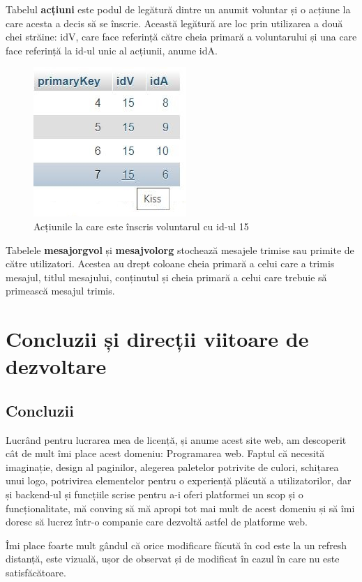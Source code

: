 \documentclass[12pt,a4paper]{report}
\begin{document}
\par
Tabelul \textbf{acțiuni} este podul de legătură dintre un anumit voluntar și o acțiune la care acesta a decis să se înscrie. Această legătură are loc prin utilizarea a două chei străine: idV, care face referință către cheia primară a voluntarului și una care face referință la id-ul unic al acțiunii, anume idA.
\\
\begin{figure}[H]
\centering
  \includegraphics[width=0.4\linewidth]{./imagini/actiuni.jpg}
  \caption{Acțiunile la care este înscris voluntarul cu id-ul 15}
\end{figure}

\par
Tabelele \textbf{mesajorgvol} și \textbf{mesajvolorg} stochează mesajele trimise sau primite de către utilizatori. Acestea au drept coloane cheia primară a celui care a trimis mesajul, titlul mesajului, conținutul și cheia primară a celui care trebuie să primească mesajul trimis.


\chapter{Concluzii și direcții viitoare de dezvoltare}
\section{Concluzii}
\par
Lucrând pentru lucrarea mea de licență, și anume acest site web, am descoperit cât de mult îmi place acest domeniu: Programarea web. Faptul că necesită imaginație, design al paginilor, alegerea paletelor potrivite de culori, schițarea unui logo, potrivirea elementelor pentru o experiență plăcută a utilizatorilor, dar și backend-ul și funcțiile scrise pentru a-i oferi platformei un scop și o funcționalitate, mă conving să mă apropi tot mai mult de acest domeniu și să îmi doresc să lucrez într-o companie care dezvoltă astfel de platforme web. 
\\ \par
Îmi place foarte mult gândul că orice modificare făcută în cod este la un refresh distanță, este vizuală, ușor de observat și de modificat în cazul în care nu este satisfăcătoare.
\end{document}
